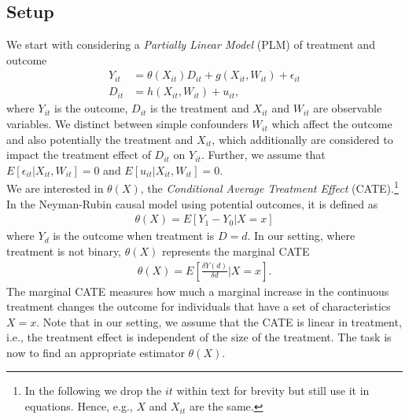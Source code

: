 \subsection{Setup} \label{sec:dml-idea}
We start with considering a \textit{Partially Linear Model} (PLM) of treatment and outcome 
\begin{align}
    Y_{it}&=\theta(X_{it})D_{it}+g(X_{it}, W_{it})+\epsilon_{it} \label{eq:plm1}\\
    D_{it}&=h(X_{it}, W_{it})+u_{it}, \label{eq:plm2}
\end{align}
where $Y_{it}$ is the outcome, $D_{it}$ is the treatment and $X_{it}$ and $W_{it}$ are observable variables. We distinct between simple confounders $W_{it}$ which affect the outcome and also potentially the treatment and $X_{it}$, which additionally are considered to impact the treatment effect of $D_{it}$ on $Y_{it}$. Further, we assume that $E[\epsilon_{it}|X_{it}, W_{it}]=0$ and $E[u_{it}|X_{it}, W_{it}]=0$. \\ 
We are interested in $\theta(X)$, the \textit{Conditional Average Treatment Effect} (CATE).\footnote{In the following we drop the $it$ within text for brevity but still use it in equations. Hence, e.g., $X$ and $X_{it}$ are the same.} In the Neyman-Rubin causal model using potential outcomes, it is defined as
\begin{align*}
    \theta(X)=E[Y_1 - Y_0 | X=x]
\end{align*}
where $Y_d$ is the outcome when treatment is $D=d$. In our setting, where treatment is not binary, $\theta(X)$ represents the marginal CATE
\begin{align*}
    \theta(X)=E\left[\frac{\delta Y(d)}{\delta d} \bigg| X=x\right].
\end{align*}
The marginal CATE measures how much a marginal increase in the continuous treatment changes the outcome for individuals that have a set of characteristics $X=x$. Note that in our setting, we assume that the CATE is linear in treatment, i.e., the treatment effect is independent of the size of the treatment. The task is now to find an appropriate estimator ${\theta}(X)$.


